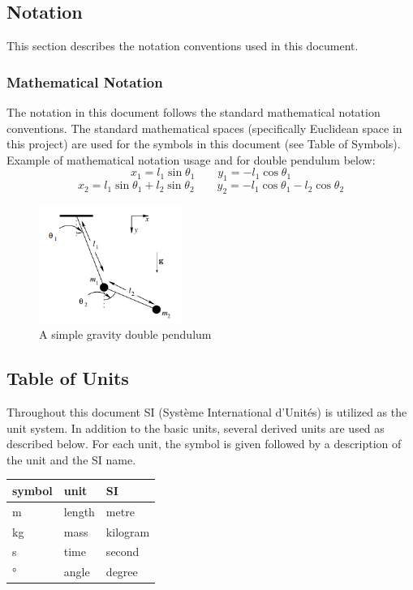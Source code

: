 \documentclass[12pt]{article}
\begin{document}
\subsection{Notation}

This section describes the notation conventions used in this document.

\subsubsection{Mathematical Notation}

The notation in this document follows the standard mathematical notation
conventions.
The standard mathematical spaces (specifically Euclidean space in this project)
are used for the symbols in this document (see Table of Symbols).
Example of mathematical notation usage and for double pendulum below:
$$x_1 = l_1 \sin\theta_1 \quad\quad y_1 = -l_1 \cos\theta_1$$
$$x_2 = l_1 \sin\theta_1 + l_2 \sin\theta_2 \quad\quad y_2 = -l_1\cos\theta_1
-l_2\cos\theta_2$$

\begin{figure}[h]
	\centering
	\includegraphics[width=175px]{doublepend.PNG}
\caption{A simple gravity double pendulum~\citep{SzuminskiOlsztyn2012}}
	\label{fig:doublepend}
\end{figure}

\newpage

\subsection{Table of Units}

Throughout this document SI (Syst\`{e}me International d'Unit\'{e}s) is
utilized as the unit system. In addition to the basic units, several derived
units are used as described below.  
For each unit, the symbol is given followed by a
description of the unit and the SI name.

\renewcommand{\arraystretch}{1.2}
\begin{center}
  \noindent \begin{tabular}{l l l} 
    \toprule		
    \textbf{symbol} & \textbf{unit} & \textbf{SI}\\
    \midrule 
    \si{\metre} & length & metre\\
    \si{\kilogram} & mass & kilogram\\
    \si{\second} & time & second\\
    \si{\degree} & angle & degree\\
    \bottomrule
  \end{tabular}
\end{center}
\end{document}
